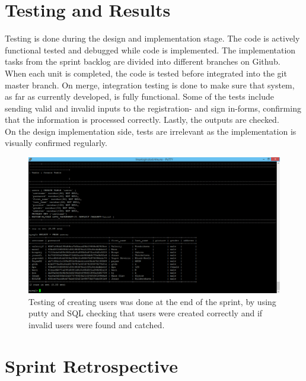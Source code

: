 \section{Testing and Results}
Testing is done during the design and implementation stage. The code is actively functional tested and debugged while code is implemented. The implementation tasks from the sprint backlog are divided into different branches on Github. When each unit is completed, the code is tested before integrated into the git master branch. On merge, integration testing is done to make sure that system, as far as currently developed, is fully functional. Some of the tests include sending valid and invalid inputs to the registration- and sign in-forms, confirming that the information is processed correctly. Lastly, the outputs are checked. \\
On the design implementation side, tests are irrelevant as the implementation is visually confirmed regularly. 

\begin{figure}[ht!]
\centering
\includegraphics[width={\linewidth}]{img/Sprint2-testing.png}
\caption{ Testing of creating users was done at the end of the sprint, by using putty and SQL checking that users were created correctly and if invalid users were found and catched. \label{overflow}}
\end{figure}

\section{Sprint Retrospective} 

